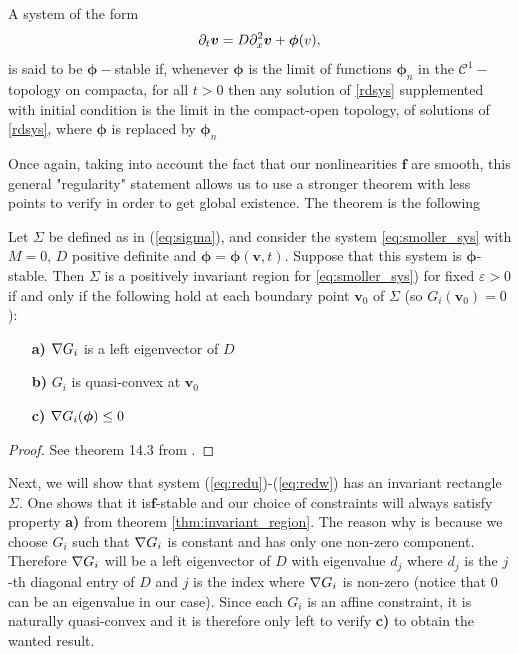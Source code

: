 \begin{definition}
	A system of the form 
	\begin{equation}
		\label{rdsys}
		\partial_t \bm v = D \partial_{x}^2 \bm v + \bm \phi (v),
	\end{equation}
	 is said to be $\bm \phi-$stable if, whenever $\bm\phi$ is the limit of functions $\bm\phi_n$ in the $\mathcal C^1-$topology on compacta, for all $t>0$ then any solution of \ref{rdsys} supplemented with initial condition is the limit in the compact-open topology, of solutions of \ref{rdsys}, where $\bm\phi$ is replaced by $\bm\phi_n$ 
\end{definition}

Once again, taking into account the fact that our nonlinearities $\bm f$ are smooth, this general "regularity" statement allows us to use a stronger theorem with less points to verify in order to get global existence. The theorem is the following 

\begin{theorem}
	\label{thm:invariant_region}
	Let $\Sigma$ be defined as in (\ref{eq:sigma}), and consider the system \ref{eq:smoller_sys} with $M = 0$, $D$ positive definite and $\bm\phi = \bm\phi(\bm v, t)$. Suppose that this system is $\bm\phi$-stable. Then $\Sigma$ is a positively invariant region for \ref{eq:smoller_sys}) for fixed $\varepsilon > 0$ if and only if the following hold at each boundary point $\bm v_0$ of $\Sigma$ (so $G_i(\bm v_0) = 0$):
	
	\begin{itemize}
		\item[\textbf{a)}] $\nabla G_i$ is a left eigenvector of $D$
		\item[\textbf{b)}] $G_i$ is quasi-convex at $\bm v_0$
		\item[\textbf{c)}] $\nabla G_i(\bm \phi) \le 0$
	\end{itemize}
\end{theorem}

\begin{proof}
	See theorem 14.3 from \cite{Smoller1994}.
\end{proof}

Next, we will show that system (\ref{eq:redu})-(\ref{eq:redw}) has an invariant rectangle $\Sigma$. One shows that it is$\bm f$-stable and our choice of constraints will always satisfy property \textbf{a)} from theorem \ref{thm:invariant_region}. The reason why is because we choose $G_i$ such that $\nabla G_i$ is constant and has only one non-zero component. Therefore $\nabla G_i$ will be a left eigenvector of $D$ with eigenvalue $d_{j}$ where $d_j$ is the $j$-th diagonal entry of $D$ and $j$ is the index where $\nabla G_i$ is non-zero (notice that 0 can be an eigenvalue in our case). Since each $G_i$ is an affine constraint, it is naturally quasi-convex and it is therefore only left to verify \textbf{c)} to obtain the wanted result.


